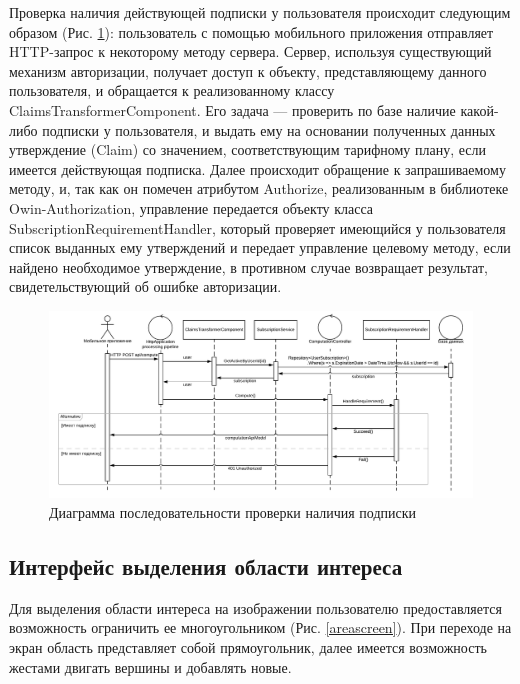 \documentclass[14pt]{matmex-diploma-custom}
\begin{document}
Проверка наличия действующей подписки у пользователя происходит следующим образом (Рис. \ref{subscriptions}): пользователь с помощью мобильного приложения отправляет HTTP-запрос к некоторому методу сервера. Сервер, используя существующий механизм авторизации, получает доступ к объекту, представляющему данного пользователя, и обращается к реализованному классу ClaimsTransformerComponent. Его задача --- проверить по базе наличие какой-либо подписки у пользователя, и выдать ему на основании полученных данных утверждение (Claim) со значением, соответствующим тарифному плану, если имеется действующая подписка. Далее происходит обращение к запрашиваемому методу, и, так как он помечен атрибутом Authorize, реализованным в библиотеке Owin-Authorization, управление передается объекту класса SubscriptionRequirementHandler, который проверяет имеющийся у пользователя список выданных ему утверждений и передает управление целевому методу, если найдено необходимое утверждение, в противном случае возвращает результат, свидетельствующий об ошибке авторизации.

\begin{figure}[h]
\centering
\includegraphics[width=\textwidth]{subscriptions.png}
\caption{Диаграмма последовательности проверки наличия подписки}
\label{subscriptions}
\end{figure}

\subsection*{Интерфейс выделения области интереса}

Для выделения области интереса на изображении пользователю предоставляется возможность ограничить ее многоугольником (Рис. \ref{areascreen}). При переходе на экран область представляет собой прямоугольник, далее имеется возможность жестами двигать вершины и добавлять новые.
\end{document}
